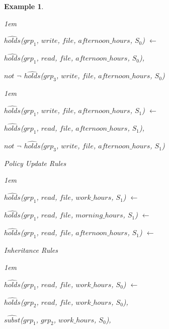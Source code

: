 \documentclass[11pt]{report}
\newtheorem{vexample}{Example}[chapter]
\newenvironment{vquote}
{
  \begin{list}{}{\leftmargin 1em}\item[]
}
{
  \end{list}
}
\begin{document}
\begin{vexample}
\begin{enumerate}
              \begin{vquote}
                $\hat{holds}$($grp_1$, $write$, $file$, $afternoon\_hours$, $S_0$) $\leftarrow$

                \hspace{1em}
                $\hat{holds}$($grp_1$, $read$, $file$, $afternoon\_hours$, $S_0$),

                \hspace{1em}
                $not$ $\lnot$ $\hat{holds}$($grp_3$, $write$, $file$, $afternoon\_hours$, $S_0$)
              \end{vquote}

              \begin{vquote}
                $\hat{holds}$($grp_1$, $write$, $file$, $afternoon\_hours$, $S_1$) $\leftarrow$

                \hspace{1em}
                $\hat{holds}$($grp_1$, $read$, $file$, $afternoon\_hours$, $S_1$),

                \hspace{1em}
                $not$ $\lnot$ $\hat{holds}$($grp_3$, $write$, $file$, $afternoon\_hours$, $S_1$)
              \end{vquote}

            \item
              Policy Update Rules

              \begin{vquote}
                $\hat{holds}$($grp_1$, $read$, $file$, $work\_hours$, $S_1$) $\leftarrow$

                $\hat{holds}$($grp_1$, $read$, $file$, $morning\_hours$, $S_1$) $\leftarrow$

                $\hat{holds}$($grp_1$, $read$, $file$, $afternoon\_hours$, $S_1$) $\leftarrow$
              \end{vquote}

            \item
              Inheritance Rules

              \begin{vquote}
                $\hat{holds}$($grp_1$, $read$, $file$, $work\_hours$, $S_0$) $\leftarrow$

                \hspace{1em}
                $\hat{holds}$($grp_2$, $read$, $file$, $work\_hours$, $S_0$),

                \hspace{1em}
                $\hat{subst}$($grp_1$, $grp_2$, $work\_hours$, $S_0$),


\end{vquote}
\end{enumerate}
\end{vexample}
\end{document}
